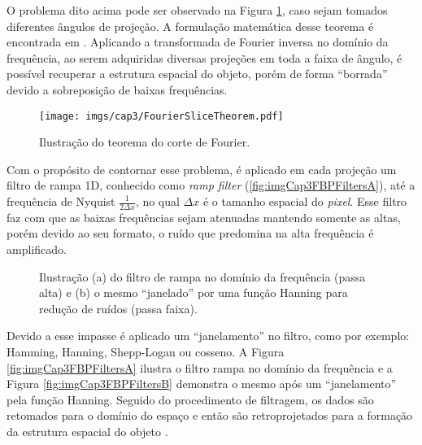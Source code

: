 O problema dito acima pode ser observado na Figura \ref{fig:imgCap3FourierSliceTheorem}, caso sejam tomados diferentes ângulos de projeção. A formulação matemática desse teorema é encontrada em . Aplicando a transformada de Fourier inversa no domínio da frequência, ao serem adquiridas diversas projeções em toda a faixa de ângulo, é possível recuperar a estrutura espacial do objeto, porém de forma ``borrada'' devido a sobreposição de baixas frequências.     

\begin{figure}[htb]
	\caption{Ilustração do teorema do corte de Fourier.}
	\begin{center}
		\texttt{[image: imgs/cap3/FourierSliceTheorem.pdf]}
	\end{center}
	\label{fig:imgCap3FourierSliceTheorem}
\end{figure}

Com o propósito de contornar esse problema, é aplicado em cada projeção um filtro de rampa \acs{1D}, conhecido como \textit{ramp filter} (\ref{fig:imgCap3FBPFiltersA}), até a frequência de Nyquist $\frac{1}{2 \varDelta x}$, no qual $\varDelta x$ é o tamanho espacial do \textit{pixel}. Esse filtro faz com que as baixas frequências sejam atenuadas mantendo somente as altas, porém devido ao seu formato, o ruído que predomina na alta frequência é amplificado. 

\begin{figure}[htb]
	\centering
	
	\caption{Ilustração (a) do filtro de rampa no domínio da frequência (passa alta) e (b) o mesmo ``janelado'' por uma função Hanning para redução de ruídos (passa faixa).}
	
	\hfil
	\hfil
	
	\label{fig:imgCap3FBPFilters}
\end{figure}

Devido a esse impasse é aplicado um ``janelamento'' no filtro, como por exemplo: Hamming, Hanning, Shepp-Logan ou cosseno. A Figura \ref{fig:imgCap3FBPFiltersA} ilustra o filtro rampa no domínio da frequência e a Figura \ref{fig:imgCap3FBPFiltersB} demonstra o mesmo após um ``janelamento'' pela função Hanning. Seguido do procedimento de filtragem, os dados são retomados para o domínio do espaço e então são retroprojetados para a formação da estrutura espacial do objeto \cite{xu2014tomographic}. 

